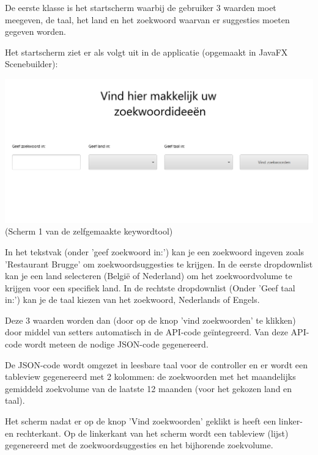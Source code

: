 De eerste klasse is het startscherm waarbij de gebruiker 3 waarden moet meegeven, de taal, het land en het zoekwoord waarvan er suggesties moeten gegeven worden. 

Het startscherm ziet er als volgt uit in de applicatie (opgemaakt in JavaFX Scenebuilder): 

\includegraphics[width=\linewidth]{Bachelorproef/bachelor/img/keywordtoolscherm1.PNG}
(Scherm 1 van de zelfgemaakte keywordtool)

In het tekstvak (onder 'geef zoekwoord in:') kan je een zoekwoord ingeven zoals 'Restaurant Brugge' om zoekwoordsuggesties te krijgen. In de eerste dropdownlist kan je een land selecteren (België of Nederland) om het zoekwoordvolume te krijgen voor een specifiek land. In de rechtste dropdownlist (Onder 'Geef taal in:') kan je de taal kiezen van het zoekwoord, Nederlands of Engels. 

Deze 3 waarden worden dan (door op de knop 'vind zoekwoorden' te klikken) door middel van setters automatisch in de API-code geïntegreerd. Van deze API-code wordt meteen de nodige JSON-code gegenereerd. 

De JSON-code wordt omgezet in leesbare taal voor de controller en er wordt een tableview gegenereerd met 2 kolommen: de zoekwoorden met het maandelijks gemiddeld zoekvolume van de laatste 12 maanden (voor het gekozen land en taal). 

Het scherm nadat er op de knop 'Vind zoekwoorden' geklikt is heeft een linker- en rechterkant. Op de linkerkant van het scherm wordt een tableview (lijst) gegenereerd met de zoekwoordsuggesties en het bijhorende zoekvolume. 

